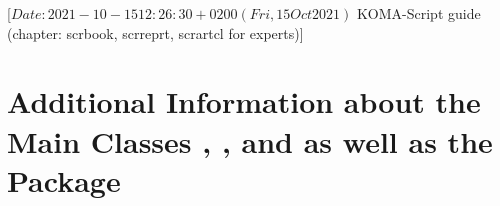 %
%
%
%
%
%
%
%
% 
%
%
%
%

                 [$Date: 2021-10-15 12:26:30 +0200 (Fri, 15 Oct 2021) $
                  KOMA-Script guide (chapter: scrbook, scrreprt, scrartcl for
                                     experts)]



\chapter[{Additional Information about the Main Classes and 
  \Package{scrextend}}]{Additional Information about the Main Classes 
  ,
  , and  as well as the Package
  }

